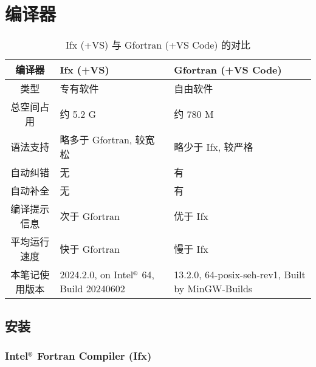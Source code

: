 \chapter{编译器}\label{fortran_compiler}
\def\r{\text{\textregistered}}

\begin{table}[!htbp]
    \centering
    \begin{tabularx}{\textwidth}{|c|X|X|}
        \hline
        编译器&Ifx (+VS)&Gfortran (+VS Code)\\
        \hline
        类型&专有软件&自由软件\\
        \hline
        总空间占用&约 5.2 G&约 780 M\\
        \hline
        语法支持&略多于 Gfortran, 较宽松&略少于 Ifx, 较严格\\
        \hline
        自动纠错&无&有\\
        \hline
        自动补全&无&有\\
        \hline
        编译提示信息&次于 Gfortran&优于 Ifx\\
        \hline
        平均运行速度&快于 Gfortran&慢于 Ifx\\
        \hline
        \hline
        本笔记使用版本&
        2024.2.0, on Intel${}^\r$ 64, Build 20240602&
        13.2.0, 64-posix-seh-rev1, Built by MinGW-Builds\\
        \hline
    \end{tabularx}
    \caption{Ifx (+VS) 与 Gfortran (+VS Code) 的对比}
\end{table}

\section{安装}

\subsection[Intel${}^\r$ Fortran\\Compiler]{Intel${}^\r$ Fortran Compiler (Ifx)}

